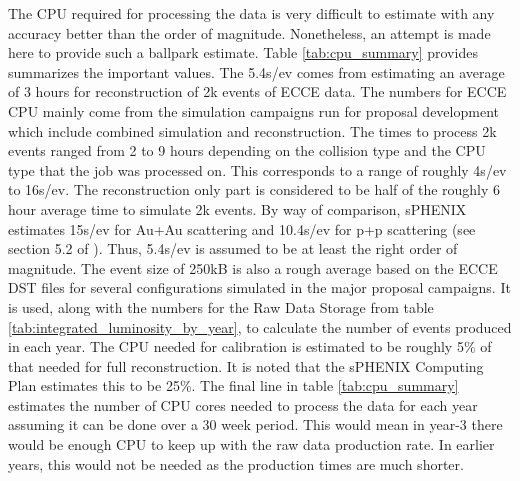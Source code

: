 The CPU required for processing the data is very difficult to estimate with any accuracy better than the order of magnitude. Nonetheless, an attempt is made here to provide such a ballpark estimate. Table \ref{tab:cpu_summary} provides summarizes the important values. The 5.4s/ev comes from estimating an average of 3 hours for reconstruction of 2k events of ECCE data. The numbers for ECCE CPU mainly come from the simulation campaigns run for proposal development which include combined simulation and reconstruction. The times to process 2k events ranged from 2 to 9 hours depending on the collision type and the CPU type that the job was processed on. This corresponds to a range of roughly 4s/ev to 16s/ev. The reconstruction only part is considered to be half of the roughly 6 hour average time to simulate 2k events. By way of comparison, sPHENIX estimates 15s/ev for Au+Au scattering and 10.4s/ev for p+p scattering (see section 5.2 of \cite{sphenix_computing_plan_2019}). Thus, 5.4s/ev is assumed to be at least the right order of magnitude. The event size of 250kB is also a rough average based on the ECCE DST files for several configurations simulated in the major proposal campaigns. It is used, along with the numbers for the Raw Data Storage from table \ref{tab:integrated_luminosity_by_year}, to calculate the number of events produced in each year. The CPU needed for calibration is estimated to be roughly 5\% of that needed for full reconstruction. It is noted that the sPHENIX Computing Plan estimates this to be 25\%. The final line in table \ref{tab:cpu_summary} estimates the number of CPU cores needed to process the data for each year assuming it can be done over a 30 week period. This would mean in year-3 there would be enough CPU to keep up with the raw data production rate. In earlier years, this would not be needed as the production times are much shorter.

